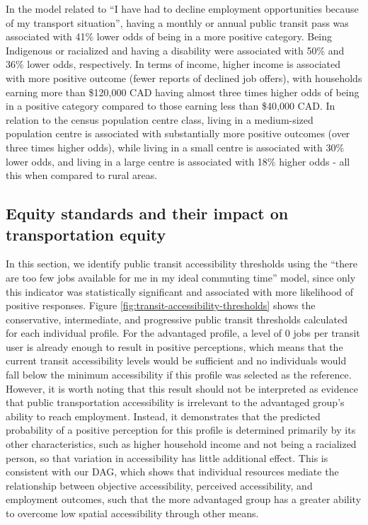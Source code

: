 \documentclass[preprint, 3p,
authoryear]{elsarticle} %
\begin{document}
In the model related to ``I have had to decline employment opportunities
because of my transport situation'', having a monthly or annual public
transit pass was associated with 41\% lower odds of being in a more
positive category. Being Indigenous or racialized and having a
disability were associated with 50\% and 36\% lower odds, respectively.
In terms of income, higher income is associated with more positive
outcome (fewer reports of declined job offers), with households earning
more than \$120,000 CAD having almost three times higher odds of being
in a positive category compared to those earning less than \$40,000 CAD.
In relation to the census population centre class, living in a
medium-sized population centre is associated with substantially more
positive outcomes (over three times higher odds), while living in a
small centre is associated with 30\% lower odds, and living in a large
centre is associated with 18\% higher odds - all this when compared to
rural areas.

\subsection{Equity standards and their impact on transportation
equity}\label{equity-standards-and-their-impact-on-transportation-equity}

In this section, we identify public transit accessibility thresholds
using the ``there are too few jobs available for me in my ideal
commuting time'' model, since only this indicator was statistically
significant and associated with more likelihood of positive responses.
Figure \ref{fig:transit-accessibility-thresholds} shows the
conservative, intermediate, and progressive public transit thresholds
calculated for each individual profile. For the advantaged profile, a
level of 0 jobs per transit user is already enough to result in positive
perceptions, which means that the current transit accessibility levels
would be sufficient and no individuals would fall below the minimum
accessibility if this profile was selected as the reference. However, it
is worth noting that this result should not be interpreted as evidence
that public transportation accessibility is irrelevant to the advantaged
group's ability to reach employment. Instead, it demonstrates that the
predicted probability of a positive perception for this profile is
determined primarily by its other characteristics, such as higher
household income and not being a racialized person, so that variation in
accessibility has little additional effect. This is consistent with our
DAG, which shows that individual resources mediate the relationship
between objective accessibility, perceived accessibility, and employment
outcomes, such that the more advantaged group has a greater ability to
overcome low spatial accessibility through other means.
\end{document}
